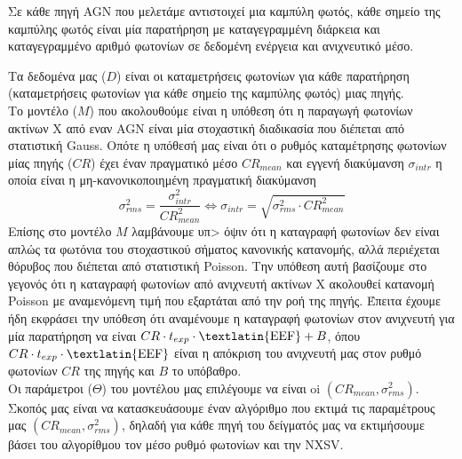 
Σε κάθε πηγή \textlatin{AGN} που μελετάμε αντιστοιχεί μια καμπύλη φωτός, κάθε σημείο της καμπύλης φωτός είναι μία παρατήρηση με καταγεγραμμένη διάρκεια και καταγεγραμμένο αριθμό φωτονίων σε δεδομένη ενέργεια και ανιχνευτικό μέσο.

Τα δεδομένα μας ($D$) είναι οι καταμετρήσεις φωτονίων για κάθε παρατήρηση (καταμετρήσεις φωτονίων για κάθε σημείο της καμπύλης φωτός) μιας πηγής.\\
Το μοντέλο ($Μ$) που ακολουθούμε είναι η υπόθεση ότι η παραγωγή φωτονίων ακτίνων Χ από εναν \textlatin{AGN} είναι μία στοχαστική διαδικασία που διέπεται από στατιστική \textlatin{Gauss}. Οπότε η υπόθεσή μας είναι ότι ο ρυθμός καταμέτρησης φωτονίων μίας πηγής ($CR$) έχει έναν πραγματικό μέσο $CR_{mean}$ και εγγενή διακύμανση $\sigma_{intr}$ η οποία είναι η μη-κανονικοποιημένη πραγματική διακύμανση \begin{equation}
\sigma_{rms}^2 = \frac {\sigma_{intr}^2}{CR_{mean}^2} \iff  \sigma_{intr} = \sqrt{\sigma_{rms}^2 \cdot CR_{mean}^2} \label{eq:SigmaIntr}\end{equation}
Επίσης στο μοντέλο $Μ$ λαμβάνουμε υπ> όψιν ότι η καταγραφή φωτονίων δεν είναι απλώς τα φωτόνια του στοχαστικού σήματος κανονικής κατανομής, αλλά περιέχεται θόρυβος που διέπεται από στατιστική \textlatin{Poisson}. Την υπόθεση αυτή βασίζουμε στο γεγονός ότι η καταγραφή φωτονίων από ανιχνευτή ακτίνων Χ ακολουθεί κατανομή \textlatin{Poisson} με αναμενόμενη τιμή που εξαρτάται από την ροή της πηγής. Έπειτα έχουμε ήδη εκφράσει την υπόθεση ότι αναμένουμε η καταγραφή φωτονίων στον ανιχνευτή για μία παρατήρηση να είναι $ CR \cdot t_{exp}\cdot \mbox{\textlatin{EEF}} + B$, όπου $ CR \cdot t_{exp}\cdot \mbox{\textlatin{EEF}}$ είναι η απόκριση του ανιχνευτή μας στον ρυθμό φωτονίων $CR$ της πηγής και $Β$ το υπόβαθρο.\\
Οι παράμετροι ($\Theta$) του μοντέλου μας επιλέγουμε να είναι oi $(CR_{mean}, \sigma_{rms}^2)$.
Σκοπός μας είναι να κατασκευάσουμε έναν αλγόριθμο που εκτιμά τις παραμέτρους μας $(CR_{mean}, \sigma_{rms}^2)$, δηλαδή για κάθε πηγή του δείγματός μας να εκτιμήσουμε βάσει του αλγορίθμου τον μέσο ρυθμό φωτονίων και την  \textlatin{NXSV.} 

